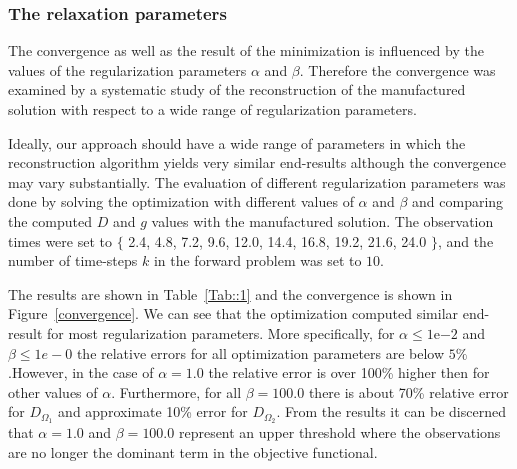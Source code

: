\documentclass[11pt,a4paper]{article}
\begin{document}
\subsubsection{The relaxation parameters}

The convergence as well as the result of the minimization is influenced by the values of the regularization parameters $\alpha$ and $\beta$. Therefore the convergence was examined by a systematic study of the reconstruction of the manufactured solution with respect to a wide range of regularization parameters. 


Ideally, our approach should have a wide range of parameters in which the reconstruction algorithm yields very similar end-results although the convergence may vary substantially. The evaluation of different regularization parameters was done by solving the optimization with different values of $\alpha$ and $\beta$ and comparing the computed $D$ and $g$ values with the manufactured solution. The observation times were set to $\lbrace$ 2.4, 4.8, 7.2, 9.6, 12.0, 14.4, 16.8, 19.2, 21.6, 24.0 $\rbrace$, and the number of time-steps $k$ in the forward problem was set to $10$. 

The results are shown in Table~\ref{Tab::1} and the convergence is shown in Figure~\ref{convergence}. We can see that the optimization computed similar end-result for most regularization parameters. More specifically, for $\alpha \leq 1\mathrm{e}{-2}$ and $\beta \leq 1e-0$ the relative errors for all optimization parameters are below $5\%$.However, in the case of $ \alpha=1.0$ the relative error is over 100\% higher then for other values of $\alpha$. Furthermore, for all $\beta=100.0$ there is about 70\% relative error for $D_{\Omega_1}$ and approximate 10\% error for $D_{\Omega_2}$. From the results it can be discerned that $\alpha =1.0$ and $\beta=100.0$ represent an upper threshold where the observations are no longer the dominant term in the objective functional.  
\end{document}
